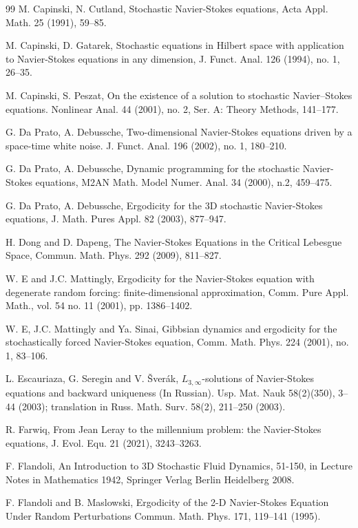 \documentclass[11pt,reqno]{amsart}
\theoremstyle{definition}
\theoremstyle{remark}
\newcommand{\<}{\langle}
\renewcommand{\>}{\rangle}
\begin{document}
\begin{thebibliography}{99}
 M. Capinski, N. Cutland, 
Stochastic Navier-Stokes equations, Acta Appl. Math. 25 (1991), 59--85. 

M. Capinski, D. Gatarek, Stochastic equations in Hilbert space with application to 
Navier-Stokes equations in any dimension, J. Funct. Anal. 126 (1994), no. 1, 26--35.

M. Capinski, S. Peszat, On the existence of a solution to stochastic Navier--Stokes equations. 
Nonlinear Anal. 44 (2001), no. 2, Ser. A: Theory Methods, 141--177.

 G. Da Prato, A. Debussche, 
Two-dimensional Navier-Stokes equations driven by a space-time white noise. 
J. Funct. Anal. 196 (2002), no. 1, 180--210.

G. Da Prato, A. Debussche, Dynamic programming for
 the stochastic Navier-Stokes equations, 
 M2AN Math. Model Numer. Anal. 34 (2000), n.2, 459--475.


G. Da Prato, A. Debussche, Ergodicity for the 3D stochastic Navier-Stokes equations, 
J. Math. Pures  Appl. 82 (2003), 877--947. 

 
H. Dong and D. Dapeng, 
The Navier-Stokes Equations in the Critical Lebesgue Space, 
Commun. Math. Phys. 292 (2009), 811--827.

 W. E and J.C. Mattingly, Ergodicity for the Navier-Stokes equation 
 with degenerate random forcing: finite-dimensional approximation, 
 Comm. Pure Appl. Math., vol. 54 no. 11 (2001), pp. 1386--1402.
 
  W. E, J.C. Mattingly and  Ya. Sinai, 
Gibbsian dynamics and ergodicity for the stochastically 
forced Navier-Stokes equation, Comm. Math. Phys. 224 (2001), no. 1, 83--106.

 
L. Escauriaza, G. Seregin and V. \v{S}ver\'ak, $L_{3,\infty}$-solutions 
of Navier-Stokes equations and backward uniqueness (In Russian). 
Usp. Mat. Nauk 58(2)(350), 3--44 (2003); 
translation in Russ. Math. Surv. 58(2),
211--250 (2003).

 
 R. Farwiq, From Jean Leray to the millennium problem: 
the Navier-Stokes equations, J. Evol. Equ. 21 (2021), 3243--3263.
 
 
 F. Flandoli, An Introduction to 3D Stochastic Fluid Dynamics, 51-150, 
in Lecture Notes in Mathematics 1942, Springer
 Verlag Berlin Heidelberg 2008. 

 
 F. Flandoli and B. Maslowski, 
Ergodicity of the 2-D Navier-Stokes Equation
Under Random Perturbations
Commun. Math. Phys. 171, 119--141 (1995).  


\end{thebibliography}
\end{document}
